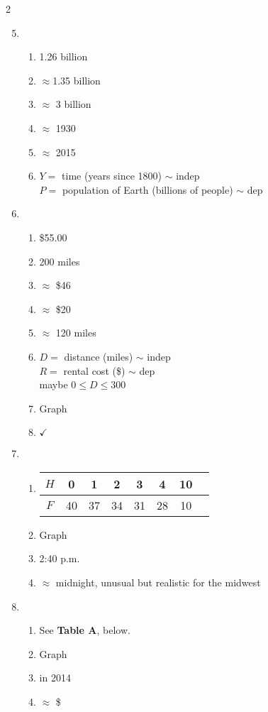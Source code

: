 \begin{multicols} {2}
\begin{enumerate}
\setcounter{enumi}{4}

\item %
\begin{enumerate}
\item 1.26 billion
\item $\approx$1.35 billion
\item $\approx$ 3 billion
\item $\approx$ 1930
\item $\approx$ 2015
\item $Y=$ time (years since 1800) $\sim$ indep \\ $P=$ population of Earth (billions of people) $\sim$ dep
\end{enumerate}

\item %
\begin{enumerate}
\item \$55.00
\item 200 miles
\item $\approx$ \$46
\item $\approx$ \$20
\item $\approx$ 120 miles
\item $D=$ distance (miles) $\sim$ indep \\ $R=$ rental cost (\$) $\sim$ dep \\ maybe $0 \le D \le 300$
\item Graph
\item $\checkmark$
\end{enumerate}

\item %
\begin{enumerate}
\item 
\begin{tabular} {|c| |c|c |c|c |c|c |c|}\hline
$H$ & 0 & 1 & 2& 3 & 4 & 10 \\ \hline
$F$ & 40 & 37 & 34 & 31 & 28 & 10  \\ \hline
\end{tabular}
\item Graph
\item 2:40 p.m.
\item $\approx$ midnight, unusual but realistic for the midwest
\end{enumerate}

\item %
\begin{enumerate}
\item  See \textbf{Table A}, below.
\item Graph
\item in 2014
\item $\approx$ \$
\end{enumerate}


\end{enumerate}
\end{multicols}
